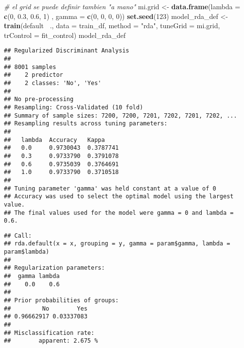 \documentclass[]{book}
\newenvironment{Shaded}{\begin{snugshade}}{\end{snugshade}}
\newcommand{\CommentTok}[1]{\textcolor[rgb]{0.56,0.35,0.01}{\textit{#1}}}
\newcommand{\DataTypeTok}[1]{\textcolor[rgb]{0.13,0.29,0.53}{#1}}
\newcommand{\DecValTok}[1]{\textcolor[rgb]{0.00,0.00,0.81}{#1}}
\newcommand{\FloatTok}[1]{\textcolor[rgb]{0.00,0.00,0.81}{#1}}
\newcommand{\KeywordTok}[1]{\textcolor[rgb]{0.13,0.29,0.53}{\textbf{#1}}}
\newcommand{\NormalTok}[1]{#1}
\newcommand{\OperatorTok}[1]{\textcolor[rgb]{0.81,0.36,0.00}{\textbf{#1}}}
\newcommand{\StringTok}[1]{\textcolor[rgb]{0.31,0.60,0.02}{#1}}
\begin{document}
\begin{Shaded}
\begin{Highlighting}[]
\CommentTok{# el grid se puede definir tambien "a mano"}
\NormalTok{mi.grid <-}\StringTok{ }\KeywordTok{data.frame}\NormalTok{(}\DataTypeTok{lambda =} \KeywordTok{c}\NormalTok{(}\DecValTok{0}\NormalTok{, }\FloatTok{0.3}\NormalTok{, }\FloatTok{0.6}\NormalTok{, }\DecValTok{1}\NormalTok{) , }
                       \DataTypeTok{gamma =} \KeywordTok{c}\NormalTok{(}\DecValTok{0}\NormalTok{, }\DecValTok{0}\NormalTok{, }\DecValTok{0}\NormalTok{, }\DecValTok{0}\NormalTok{))}
\KeywordTok{set.seed}\NormalTok{(}\DecValTok{123}\NormalTok{)}
\NormalTok{model_rda_def <-}\StringTok{ }\KeywordTok{train}\NormalTok{(default }\OperatorTok{~}\NormalTok{.,}
                       \DataTypeTok{data =}\NormalTok{ train_df,}
                       \DataTypeTok{method =} \StringTok{"rda"}\NormalTok{,}
                       \DataTypeTok{tuneGrid =}\NormalTok{ mi.grid,}
                       \DataTypeTok{trControl =}\NormalTok{ fit_control)}
\NormalTok{model_rda_def}
\end{Highlighting}
\end{Shaded}

\begin{verbatim}
## Regularized Discriminant Analysis 
## 
## 8001 samples
##    2 predictor
##    2 classes: 'No', 'Yes' 
## 
## No pre-processing
## Resampling: Cross-Validated (10 fold) 
## Summary of sample sizes: 7200, 7200, 7201, 7202, 7201, 7202, ... 
## Resampling results across tuning parameters:
## 
##   lambda  Accuracy   Kappa    
##   0.0     0.9730043  0.3787741
##   0.3     0.9733790  0.3791078
##   0.6     0.9735039  0.3764691
##   1.0     0.9733790  0.3710518
## 
## Tuning parameter 'gamma' was held constant at a value of 0
## Accuracy was used to select the optimal model using the largest value.
## The final values used for the model were gamma = 0 and lambda = 0.6.
\end{verbatim}

\begin{Shaded}
\end{Shaded}

\begin{verbatim}
## Call: 
## rda.default(x = x, grouping = y, gamma = param$gamma, lambda = param$lambda)
## 
## Regularization parameters: 
##  gamma lambda 
##    0.0    0.6 
## 
## Prior probabilities of groups: 
##         No        Yes 
## 0.96662917 0.03337083 
## 
## Misclassification rate: 
##        apparent: 2.675 %
\end{verbatim}
\end{document}
